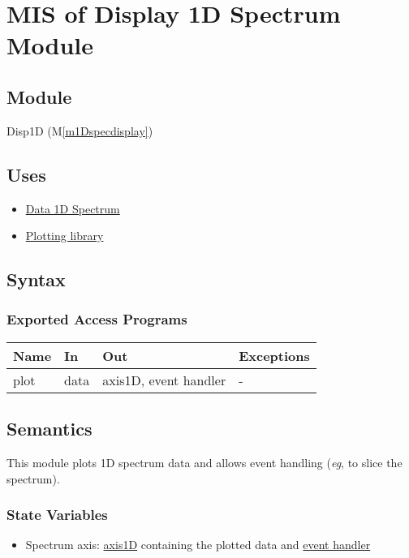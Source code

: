 \documentclass[12pt, titlepage]{article}
\newcommand{\mref}[1]{M\ref{#1}}
\begin{document}
\newpage
\section{MIS of Display 1D Spectrum Module} \label{Mod:Disp1D}

\subsection{Module}

Disp1D (\mref{m1Dspecdisplay})

\subsection{Uses}
\begin{itemize}
    \item \hyperref[Mod:Spectrum]{Data 1D Spectrum}
    \item \hyperref[Mod:Plotting]{Plotting library}
\end{itemize}

\subsection{Syntax}

\subsubsection{Exported Access Programs}

\begin{center}
    \begin{tabular}{p{2cm} p{4cm} p{4cm} p{2cm}}
        \hline
        \textbf{Name} & \textbf{In} & \textbf{Out} & \textbf{Exceptions} \\
        \hline
        plot & data & axis1D, event handler & - \\
        \hline
    \end{tabular}
\end{center}

\subsection{Semantics}
This module plots 1D spectrum data and allows event handling (\textit{eg}, to
slice the spectrum).

\subsubsection{State Variables}
\begin{itemize}
    \item Spectrum axis: \hyperref[Mod:Plotting]{axis1D} containing the plotted
    data and \hyperref[Mod:Plotting]{event handler}
\end{itemize}
\end{document}
